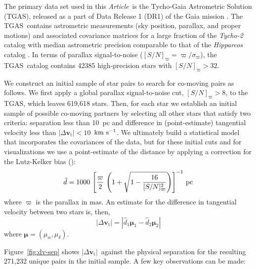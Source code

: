 \documentclass[manuscript, letterpaper]{aastex6}
\newcommand{\project}[1]{\textsl{#1}}
\newcommand{\acronym}[1]{{\small{#1}}}
\newcommand{\documentname}{\textsl{Article}}
\newcommand{\dr}{\acronym{DR1}}
\newcommand{\tgas}{\acronym{TGAS}}
\newcommand{\bs}[1]{\boldsymbol{#1}}
\renewcommand{\vec}[1]{\bs{#1}}
\newcommand{\kms}{\ensuremath{\rm km~s^{-1}}}
\newcommand{\snr}{[S/N]_\varpi}
\newcommand{\absdvtan}{\ensuremath{|\Delta\vec v_\mathrm{t}|}}
\begin{document}
The primary data set used in this \documentname\ is the Tycho-Gaia Astrometric
Solution (\tgas), released as a part of Data Release 1 (\dr) of the Gaia mission
\citep{Gaia-Collaboration:2016aa,Lindegren:2016aa}.
The \tgas\ contains astrometric measurements (sky position,
parallax, and proper motions) and associated covariance matrices for a large
fraction of the \project{Tycho-2} catalog \citep{2000A&A...355L..27H} with median
astrometric precision comparable to that of the \project{Hipparcos} catalog
\citep[$\approx 0.3~{\rm mas}$;][]{2007ASSL..350.....V}. In terms of parallax
signal-to-noise ($\snr = \varpi/\sigma_\varpi$), the \tgas\ catalog contains
42385 high-precision stars with $\snr > 32$.

We construct an initial sample of star pairs to search for co-moving pairs as
follows.
We first apply a global parallax signal-to-noise cut, $\snr > 8$,  to the \tgas,
which leaves 619,618 stars.
Then, for each star we establish an initial sample of possible
co-moving partners by selecting all other stars that satisfy two criteria:
separation less than 10~pc and difference
in (point-estimate) tangential velocity less than $\absdvtan < 10$~\kms.
We ultimately build a statistical model that incorporates the covariances of the
data, but for these initial cuts and for visualizations we use a point-estimate
of the distance by applying a correction for the Lutz-Kelker bias
(\citealt{Lutz:1973aa}):
\begin{equation}
  \hat{d} = 1000 \, \left[\frac{\varpi}{2} \,
    \left(1 + \sqrt{1 - \frac{16}{\snr^2}} \right) \right]^{-1} \, {\rm pc}
    \label{eq:dist}
\end{equation}
where $\varpi$ is the parallax in mas.
An estimate for the difference in tangential velocity between two stars is,
then,
\begin{equation}
  \absdvtan = |\hat{d}_1 \vec\mu_1 - \hat{d}_2 \vec\mu_2|
\end{equation}
where $\vec\mu = (\mu_\alpha, \mu_\delta)$.

Figure~\ref{fig:dv-sep} shows \absdvtan\ against the physical separation
for the resulting 271,232 unique pairs in the initial sample.
A few key observations can be made:
\end{document}
